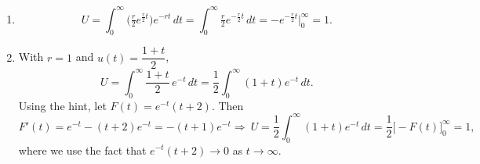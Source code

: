 \documentclass[11pt]{exam}
\begin{document}
\begin{questions}
\begin{enumerate}[leftmargin = 0.5cm, label = (\alph*), rightmargin = 0.2cm]
    \end{enumerate}

\begin{solution}
    \begin{enumerate}[leftmargin=0.55cm, label=(\alph*), rightmargin=0.2cm]
        
        \item 
        \[
        U=\int_{0}^{\infty}\Big(\tfrac{r}{2}e^{\frac{r}{2}t}\Big)e^{-rt}\,dt
        =\int_{0}^{\infty} \tfrac{r}{2}e^{-\frac{r}{2}t}\,dt
        =-e^{-\frac{r}{2}t}\big|_0^\infty
        =1.
        \]
        
        \item With $r=1$ and $u(t)=\dfrac{1+t}{2}$,
        \[
        U=\int_0^\infty \frac{1+t}{2}\,e^{-t}\,dt
        =\frac{1}{2}\int_0^\infty (1+t)e^{-t}\,dt.
        \]
        Using the hint, let $F(t)=e^{-t}(t+2)$. Then
        \[
        F'(t)=e^{-t}-(t+2)e^{-t}=-(t+1)e^{-t}
        \Rightarrow\
        U=\frac{1}{2}\int_0^\infty (1+t)e^{-t}\,dt
        =\frac{1}{2}\big[-F(t)\big]_0^\infty
        =1,
        \]
        where we use the fact that $e^{-t}(t+2)\to 0$ as $t\to\infty$. 

    \end{enumerate}
\end{solution}


\end{questions}	
\end{document}
